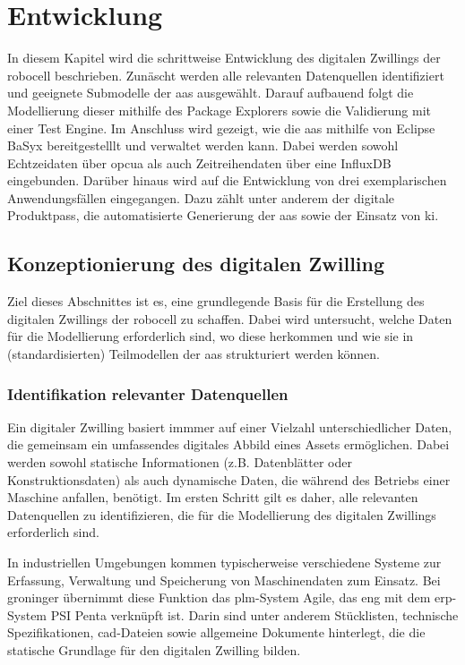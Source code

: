 \section{Entwicklung}
In diesem Kapitel wird die schrittweise Entwicklung des digitalen Zwillings der robocell beschrieben.
Zunäscht werden alle relevanten Datenquellen identifiziert und geeignete Submodelle der \acs{aas} ausgewählt.
Darauf aufbauend folgt die Modellierung dieser mithilfe des Package Explorers sowie die Validierung mit einer Test Engine.
Im Anschluss wird gezeigt, wie die \acs{aas} mithilfe von Eclipse BaSyx bereitgestelllt und verwaltet werden kann.
Dabei werden sowohl Echtzeidaten über \acs{opcua} als auch Zeitreihendaten über eine InfluxDB eingebunden.
Darüber hinaus wird auf die Entwicklung von drei exemplarischen Anwendungsfällen eingegangen.
Dazu zählt unter anderem der digitale Produktpass, die automatisierte Generierung der \acs{aas} sowie der Einsatz von \acs{ki}.

\subsection{Konzeptionierung des digitalen Zwilling}
Ziel dieses Abschnittes ist es, eine grundlegende Basis für die Erstellung des digitalen Zwillings der robocell zu schaffen.
Dabei wird untersucht, welche Daten für die Modellierung erforderlich sind, wo diese herkommen und wie sie in (standardisierten) Teilmodellen der \acs{aas} strukturiert werden können.
\subsubsection{Identifikation relevanter Datenquellen}
Ein digitaler Zwilling basiert immmer auf einer Vielzahl unterschiedlicher Daten, die gemeinsam ein umfassendes digitales Abbild eines Assets ermöglichen. 
Dabei werden sowohl statische Informationen (z.B. Datenblätter oder Konstruktionsdaten) als auch dynamische Daten, die während des Betriebs einer Maschine anfallen, benötigt.
Im ersten Schritt gilt es daher, alle relevanten Datenquellen zu identifizieren, die für die Modellierung des digitalen Zwillings erforderlich sind.

In industriellen Umgebungen kommen typischerweise verschiedene Systeme zur Erfassung, Verwaltung und Speicherung von Maschinendaten zum Einsatz.
Bei groninger übernimmt diese Funktion das \acs{plm}-System Agile, das eng mit dem \acs{erp}-System PSI Penta verknüpft ist.
Darin sind unter anderem Stücklisten, technische Spezifikationen, \acs{cad}-Dateien sowie allgemeine Dokumente hinterlegt, die die statische Grundlage  für den digitalen Zwilling bilden.

